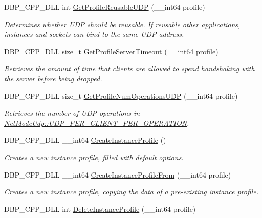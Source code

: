 \begin{DoxyCompactItemize}
DBP\_\-CPP\_\-DLL int \hyperlink{namespacemn_aaba1cc458821e0784f123aaf44daf8e9}{GetProfileReusableUDP} (\_\-\_\-int64 profile)
\begin{DoxyCompactList}\small\item\em Determines whether UDP should be reusable. If reusable other applications, instances and sockets can bind to the same UDP address. \item\end{DoxyCompactList}\item 
DBP\_\-CPP\_\-DLL size\_\-t \hyperlink{namespacemn_a1466e9a3ae29a949efe1ce5acdd4ad5f}{GetProfileServerTimeout} (\_\-\_\-int64 profile)
\begin{DoxyCompactList}\small\item\em Retrieves the amount of time that clients are allowed to spend handshaking with the server before being dropped. \item\end{DoxyCompactList}\item 
DBP\_\-CPP\_\-DLL size\_\-t \hyperlink{namespacemn_ada5cdd9d36f80d959853aa4fdd3e34d3}{GetProfileNumOperationsUDP} (\_\-\_\-int64 profile)
\begin{DoxyCompactList}\small\item\em Retrieves the number of UDP operations in \hyperlink{class_net_mode_a43cfa55ee6a4db66a8d7d6c27f766964a947fd0828716fc0442ea546cce111c27}{NetModeUdp::UDP\_\-PER\_\-CLIENT\_\-PER\_\-OPERATION}. \item\end{DoxyCompactList}\item 
DBP\_\-CPP\_\-DLL \_\-\_\-int64 \hyperlink{namespacemn_a048256bb7a8ee6ab812d4696cefd61af}{CreateInstanceProfile} ()
\begin{DoxyCompactList}\small\item\em Creates a new instance profile, filled with default options. \item\end{DoxyCompactList}\item 
DBP\_\-CPP\_\-DLL \_\-\_\-int64 \hyperlink{namespacemn_a9f8d86986cd43ca15ab482b4abe99945}{CreateInstanceProfileFrom} (\_\-\_\-int64 profile)
\begin{DoxyCompactList}\small\item\em Creates a new instance profile, copying the data of a pre-\/existing instance profile. \item\end{DoxyCompactList}\item 
DBP\_\-CPP\_\-DLL int \hyperlink{namespacemn_a49327f5b522c5c0d6d18a84c975cd2aa}{DeleteInstanceProfile} (\_\-\_\-int64 profile)

\end{DoxyCompactItemize}
